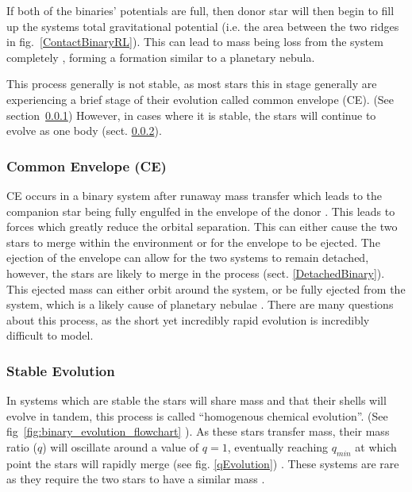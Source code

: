 \documentclass[12pt, a4paper]{article}
\begin{document}
        If both of the binaries' potentials are full, then donor star will then begin to fill up the systems total gravitational potential (i.e. the area between the two ridges in fig.~\ref{ContactBinaryRL}). This can lead to mass being loss from the system completely \parencite{TaurisvandenHeuvel+2023}, forming a formation similar to a planetary nebula.
        
        This process generally is not stable, as most stars this in stage generally are experiencing a brief stage of their evolution called common envelope (CE). (See section~\ref{CommonEnvelope}) However, in cases where it is stable, the stars will continue to evolve as one body (sect. \ref{CommonEnvelopeStableEvoluton}).
        
        
        \subsubsection{Common Envelope (CE)}\label{CommonEnvelope}

            CE occurs in a binary system after runaway mass transfer which leads to the companion star being fully engulfed in the envelope of the donor \parencite{TaurisvandenHeuvel+2023}. This leads to forces which greatly reduce the orbital separation. This can either cause the two stars to merge within the environment or for the envelope to be ejected. The ejection of the envelope can allow for the two systems to remain detached, however, the stars are likely to merge in the process \parencite{TaurisvandenHeuvel+2023} (sect. \ref{DetachedBinary}). This ejected mass can either orbit around the system, or be fully ejected from the system, which is a likely cause of planetary nebulae \parencite{TaurisvandenHeuvel+2023}. There are many questions about this process, as the short yet incredibly rapid evolution is incredibly difficult to model. \parencite{TaurisvandenHeuvel+2023}

        \subsubsection{Stable Evolution}\label{CommonEnvelopeStableEvoluton}
            In systems which are stable the stars will share mass and that their shells will evolve in tandem, this process is called ``homogenous chemical evolution''. (See fig~\ref{fig:binary_evolution_flowchart} \parencite{Chen_2024}). As these stars transfer mass, their mass ratio ($q$) will oscillate around a value of $q=1$, eventually reaching $q_{min}$ at which point the stars will rapidly merge (see fig. \ref{qEvolution}) \parencite{Pešta_2023}. These systems are rare as they require the two stars to have a similar mass \parencite{TaurisvandenHeuvel+2023}. 
            
\end{document}
